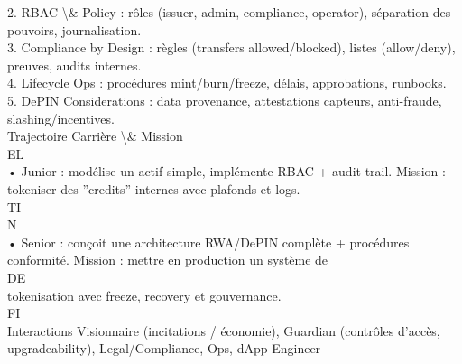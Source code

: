 \documentclass[12pt,landscape,a4paper]{article}
\begin{document}
\vspace{0.5em}
2. RBAC \textbackslash{}& Policy : rôles (issuer, admin, compliance, operator), séparation des pouvoirs, journalisation.\\
\vspace{0.5em}
3. Compliance by Design : règles (transfers allowed/blocked), listes (allow/deny), preuves, audits internes.\\
\vspace{0.5em}
4. Lifecycle Ops : procédures mint/burn/freeze, délais, approbations, runbooks.\\
\vspace{0.5em}
5. DePIN Considerations : data provenance, attestations capteurs, anti-fraude, slashing/incentives.\\
\vspace{0.5em}
Trajectoire Carrière \textbackslash{}& Mission\\
\vspace{0.5em}
\vspace{0.5em}
\vspace{0.5em}
\vspace{0.5em}
EL\\
• Junior : modélise un actif simple, implémente RBAC + audit trail. Mission : tokeniser des ”credits” internes avec plafonds et logs.\\
\vspace{0.5em}
\vspace{0.5em}
\vspace{0.5em}
\vspace{0.5em}
TI\\
N\\
• Senior : conçoit une architecture RWA/DePIN complète + procédures conformité. Mission : mettre en production un système de\\
\vspace{0.5em}
\vspace{0.5em}
\vspace{0.5em}
\vspace{0.5em}
DE\\
tokenisation avec freeze, recovery et gouvernance.\\
\vspace{0.5em}
\vspace{0.5em}
\vspace{0.5em}
\vspace{0.5em}
FI\\
Interactions Visionnaire (incitations / économie), Guardian (contrôles d’accès, upgradeability), Legal/Compliance, Ops, dApp Engineer\\
\end{document}
